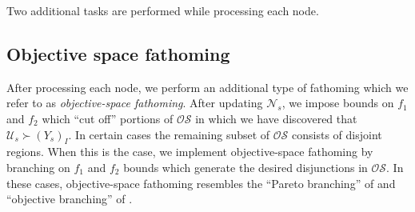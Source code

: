 \documentclass[11.5pt]{article}
\newcommand{\dom}{\succ}
\newcommand{\U}{\mathcal{U}}
\newcommand{\N}{\mathcal{N}}
\newcommand{\OS}{\mathcal{OS}}
\newcommand{\objf}{\boldsymbol{f}}
\begin{document}
%
%    		

Two additional tasks are performed while processing each node. 

\subsection{Objective space fathoming}
After processing each node, we perform an additional type of fathoming which we refer to as \emph{objective-space fathoming}. After updating $\N_s$, we impose bounds on $f_1$ and $f_2$ which ``cut off'' portions of $\OS$ in which we have discovered that $\U_s \dom (Y_s)_I$. In certain cases the remaining subset of $\OS$ %
consists of disjoint regions. When this is the case, we implement objective-space fathoming by branching on $f_1$ and $f_2$ bounds which generate the desired disjunctions in $\OS$. In these cases, objective-space fathoming resembles the ``Pareto branching'' of \citep{stidsen2014branch} and ``objective branching'' of \citep{parragh2015boip}. 
\end{document}
